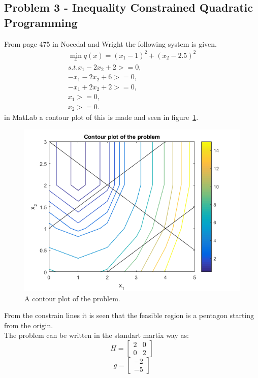 \subsection{Problem 3 - Inequality Constrained Quadratic Programming}
From page 475 in Nocedal and Wright the following system is given.
\begin{equation}
\begin{split}
\min_{x} q(x) = (x_1-1)^2+(x_2-2.5)^2 \\
s.t. x_1-2x_2+2> = 0,\\
-x_1-2x_2+6>=0,\\
-x_1+2x_2+2>=0,\\
x_1>=0,\\
x_2>=0.
\end{split}
\end{equation}
in MatLab a contour plot of this is made and seen in figure~\ref{fig:exe3_contour_plot}.
\begin{figure}[H]
	\centering
		\includegraphics{exe3_contour_plot.png}
	\caption{A contour plot of the problem.}
	\label{fig:exe3_contour_plot}
\end{figure}
From the constrain lines it is seen that the feasible region is a pentagon starting from the origin.\\
The problem can be written in the standart martix way as:
\[H=\begin{bmatrix}
	2 & 0 \\0 & 2
\end{bmatrix}\]
\[g=\begin{bmatrix}
	-2 \\-5
\end{bmatrix}\]
